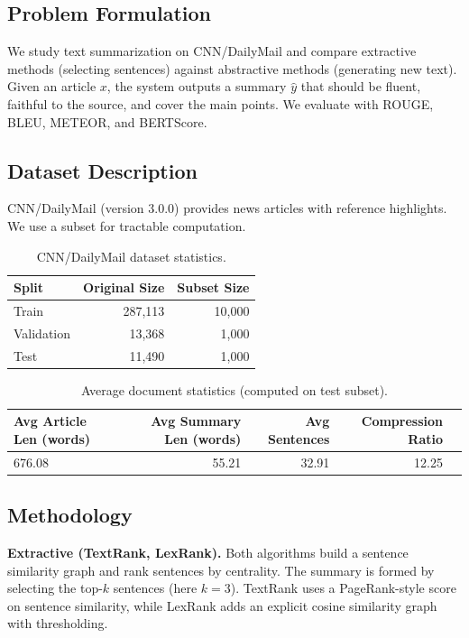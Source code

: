 
\subsection{Problem Formulation}
We study text summarization on CNN/DailyMail and compare extractive methods (selecting sentences) against abstractive methods (generating new text). Given an article $x$, the system outputs a summary $\hat{y}$ that should be fluent, faithful to the source, and cover the main points. We evaluate with ROUGE, BLEU, METEOR, and BERTScore.

\subsection{Dataset Description}
CNN/DailyMail \citep{Hermann2015cnndm} (version 3.0.0) provides news articles with reference highlights. We use a subset for tractable computation.

\begin{table}[H]
\centering
\caption{CNN/DailyMail dataset statistics.}
\begin{tabular}{lrr}
\toprule
\textbf{Split} & \textbf{Original Size} & \textbf{Subset Size} \\
\midrule
Train & 287,113 & 10,000 \\
Validation & 13,368 & 1,000 \\
Test & 11,490 & 1,000 \\
\bottomrule
\end{tabular}
\end{table}

\begin{table}[H]
\centering
\caption{Average document statistics (computed on test subset).}
\begin{tabular}{lrrrr}
\toprule
\textbf{Avg Article Len (words)} & \textbf{Avg Summary Len (words)} & \textbf{Avg Sentences} & \textbf{Compression Ratio} \\
\midrule
676.08 & 55.21 & 32.91 & 12.25 \\
\bottomrule
\end{tabular}
\end{table}

\subsection{Methodology}
\textbf{Extractive (TextRank, LexRank).} Both algorithms build a sentence similarity graph and rank sentences by centrality. The summary is formed by selecting the top-$k$ sentences (here $k=3$). TextRank \citep{MihalceaTarau2004textrank} uses a PageRank-style score on sentence similarity, while LexRank \citep{ErkanRadev2004lexrank} adds an explicit cosine similarity graph with thresholding.

